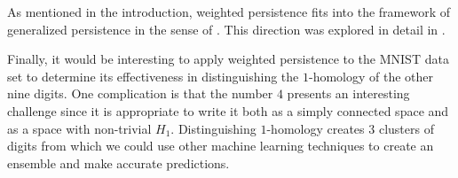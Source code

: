 \documentclass{amsart}
\newtheorem*{fibering lemma}{Fibering Lemma}
\newtheorem*{decomposition lemma}{Decomposition Lemma}
\newtheorem*{hurewicz theorem}{Hurewicz Theorem}
\theoremstyle{definition}
\begin{document}
As mentioned in the introduction, weighted persistence fits into the framework of generalized persistence in the sense of \cite{BdSS}. This direction was explored in detail in \cite{Josh}.

Finally, it would be interesting to apply weighted persistence to the MNIST data set to determine its effectiveness in distinguishing the $1$-homology of the other nine digits. One complication is that the number $4$ presents an interesting challenge since it is appropriate to write it both as a simply connected space and as a space with non-trivial $H_1$. Distinguishing $1$-homology creates 3 clusters of digits from which we could use other machine learning techniques to create an ensemble and make accurate predictions.

\end{document}
